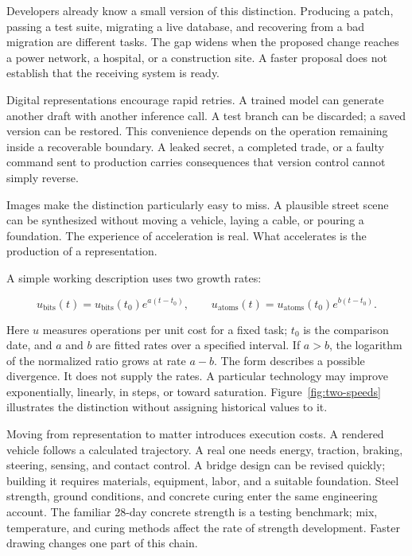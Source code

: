 Developers already know a small version of this distinction. Producing a patch, passing a test suite, migrating a live database, and recovering from a bad migration are different tasks. The gap widens when the proposed change reaches a power network, a hospital, or a construction site. A faster proposal does not establish that the receiving system is ready.

Digital representations encourage rapid retries. A trained model can generate another draft with another inference call. A test branch can be discarded; a saved version can be restored. This convenience depends on the operation remaining inside a recoverable boundary. A leaked secret, a completed trade, or a faulty command sent to production carries consequences that version control cannot simply reverse.

Images make the distinction particularly easy to miss. A plausible street scene can be synthesized without moving a vehicle, laying a cable, or pouring a foundation. The experience of acceleration is real. What accelerates is the production of a representation.

A simple working description uses two growth rates:

\begin{equation}
u_{\mathrm{bits}}(t)=u_{\mathrm{bits}}(t_0)e^{a(t-t_0)},
\qquad
u_{\mathrm{atoms}}(t)=u_{\mathrm{atoms}}(t_0)e^{b(t-t_0)}.
\end{equation}

Here $u$ measures operations per unit cost for a fixed task; $t_0$ is the comparison date, and $a$ and $b$ are fitted rates over a specified interval. If $a>b$, the logarithm of the normalized ratio grows at rate $a-b$. The form describes a possible divergence. It does not supply the rates. A particular technology may improve exponentially, linearly, in steps, or toward saturation. Figure~\ref{fig:two-speeds} illustrates the distinction without assigning historical values to it.




Moving from representation to matter introduces execution costs. A rendered vehicle follows a calculated trajectory. A real one needs energy, traction, braking, steering, sensing, and contact control. A bridge design can be revised quickly; building it requires materials, equipment, labor, and a suitable foundation. Steel strength, ground conditions, and concrete curing enter the same engineering account. The familiar 28-day concrete strength is a testing benchmark; mix, temperature, and curing methods affect the rate of strength development. Faster drawing changes one part of this chain.

